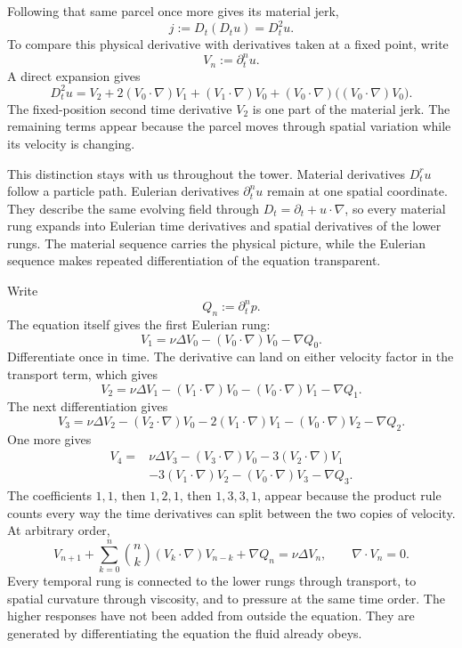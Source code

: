 Following that same parcel once more gives its material jerk,
\[
  j:=D_t(D_tu)=D_t^2u.
\]
To compare this physical derivative with derivatives taken at a fixed point, write
\[
  V_n:=\partial_t^n u.
\]
A direct expansion gives
\[
  D_t^2u
  =
  V_2
  +2(V_0\cdot\nabla)V_1
  +(V_1\cdot\nabla)V_0
  +(V_0\cdot\nabla)\bigl((V_0\cdot\nabla)V_0\bigr).
\]
The fixed-position second time derivative \(V_2\) is one part of the material jerk.
The remaining terms appear because the parcel moves through spatial variation while its velocity is changing.

This distinction stays with us throughout the tower.
Material derivatives \(D_t^ru\) follow a particle path.
Eulerian derivatives \(\partial_t^nu\) remain at one spatial coordinate.
They describe the same evolving field through \(D_t=\partial_t+u\cdot\nabla\), so every material rung expands into Eulerian time derivatives and spatial derivatives of the lower rungs.
The material sequence carries the physical picture, while the Eulerian sequence makes repeated differentiation of the equation transparent.


Write
\[
  Q_n:=\partial_t^n p.
\]
The equation itself gives the first Eulerian rung:
\[
  V_1
  =
  \nu\Delta V_0
  -(V_0\cdot\nabla)V_0
  -\nabla Q_0.
\]
Differentiate once in time.
The derivative can land on either velocity factor in the transport term, which gives
\[
  V_2
  =
  \nu\Delta V_1
  -(V_1\cdot\nabla)V_0
  -(V_0\cdot\nabla)V_1
  -\nabla Q_1.
\]
The next differentiation gives
\[
  V_3
  =
  \nu\Delta V_2
  -(V_2\cdot\nabla)V_0
  -2(V_1\cdot\nabla)V_1
  -(V_0\cdot\nabla)V_2
  -\nabla Q_2.
\]
One more gives
\[
  \begin{aligned}
  V_4
  ={}&
  \nu\Delta V_3
  -(V_3\cdot\nabla)V_0
  -3(V_2\cdot\nabla)V_1\\
  &-3(V_1\cdot\nabla)V_2
  -(V_0\cdot\nabla)V_3
  -\nabla Q_3.
  \end{aligned}
\]
The coefficients \(1,1\), then \(1,2,1\), then \(1,3,3,1\), appear because the product rule counts every way the time derivatives can split between the two copies of velocity.
At arbitrary order,
\[
  V_{n+1}
  +
  \sum_{k=0}^{n}
  \binom{n}{k}
  (V_k\cdot\nabla)V_{n-k}
  +
  \nabla Q_n
  =
  \nu\Delta V_n,
  \qquad
  \nabla\cdot V_n=0.
\]
Every temporal rung is connected to the lower rungs through transport, to spatial curvature through viscosity, and to pressure at the same time order.
The higher responses have not been added from outside the equation.
They are generated by differentiating the equation the fluid already obeys.

